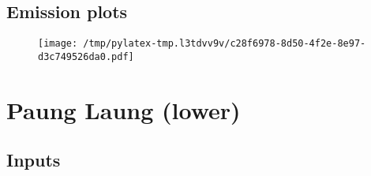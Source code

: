 \documentclass{article}%
\begin{document}
\subsection{Emission plots}%
\label{subsec:Emissionplots}%


\begin{figure}[htbp]%
\centering%
\texttt{[image: /tmp/pylatex-tmp.l3tdvv9v/c28f6978-8d50-4f2e-8e97-d3c749526da0.pdf]}%
\end{figure}

%
\section{Paung Laung (lower)}%
\label{sec:PaungLaung(lower)}%
\subsection{Inputs}%
\label{subsec:Inputs}%
\end{document}
